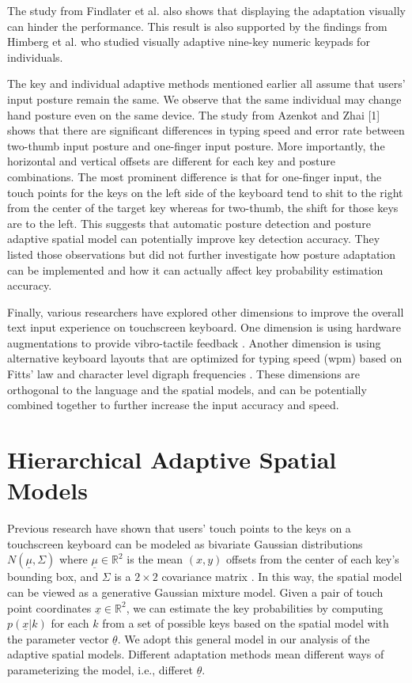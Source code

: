 \documentclass{sigchi}
\begin{document}
The study from Findlater et al. also shows that displaying the adaptation visually can hinder
the performance. This result is also supported by the findings from Himberg et al. \cite{Himberg:2003} who 
studied visually adaptive nine-key numeric keypads for individuals.  

The key and individual adaptive methods mentioned earlier all assume that users' input posture
remain the same. We observe that the same individual may change hand posture even on the same device. 
The study from Azenkot and Zhai [1] shows that there are significant differences 
in typing speed and error rate between two-thumb input posture and one-finger 
input posture. More importantly, the horizontal and vertical offsets are 
different for each key and posture combinations. The most prominent difference is that for
one-finger input, the touch points for the keys on the left side of the keyboard tend to
shit to the right from the center of the target key whereas for two-thumb, the shift for those
keys are to the left. This suggests that automatic posture detection and posture
adaptive spatial model can potentially improve key detection accuracy. They listed those observations but
did not further investigate how posture adaptation can be implemented and how it can actually affect key probability estimation accuracy.

Finally, various researchers have explored other dimensions to improve the overall
text input experience on touchscreen keyboard. One dimension is using hardware
augmentations to provide vibro-tactile feedback \cite{Brewster:2007, Hoggan:2008}. 
Another dimension is using alternative keyboard layouts that are optimized for typing speed (wpm)
based on Fitts' law and character level digraph frequencies \cite{Zhai:2000, MacKenzie:1999}.
These dimensions are orthogonal to the language and the spatial models, and can be potentially 
combined together to further increase the input accuracy and speed.

\section{Hierarchical Adaptive Spatial Models}
Previous research have shown that users' touch points to the keys on a touchscreen
keyboard can be modeled as bivariate Gaussian distributions $N(\underline\mu, \Sigma)$
where $\underline\mu \in \mathbb{R}^2$ is the mean $(x, y)$ offsets from the center of
each key's bounding box, and $\Sigma$ is a $2\times 2$ covariance matrix  
\cite{Azenkot:2012, Goodman:2002, Rashid:2008}.
In this way, the spatial model can be viewed as a generative Gaussian mixture
model.  Given a pair of touch point coordinates $\underline x \in \mathbb{R}^2$, 
we can estimate the key probabilities by computing
$p(\underline x | k)$ for each $k$ from a set of possible keys based on the
spatial model with the parameter vector $\underline\theta$.
We adopt this general model in our analysis of the adaptive spatial models.
Different adaptation methods mean different ways of parameterizing the model, i.e., differet
$\underline\theta$.
\end{document}
